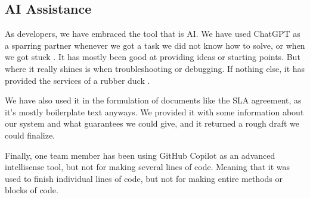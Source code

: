 \subsection{AI Assistance}

As developers, we have embraced the tool that is AI. We have used ChatGPT as a sparring partner whenever we got a task we did not know how to solve, or when we got stuck \autocite{chatgpt}. It has mostly been good at providing ideas or starting points. But where it really shines is when troubleshooting or debugging. If nothing else, it has provided the services of a rubber duck \autocite{rubber-duck-debugging}.

We have also used it in the formulation of documents like the SLA agreement, as it's mostly boilerplate text anyways. We provided it with some information about our system and what guarantees we could give, and it returned a rough draft we could finalize.

Finally, one team member has been using GitHub Copilot \autocite{github-copilot} as an advanced intellisense tool, but not for making several lines of code. Meaning that it was used to finish individual lines of code, but not for making entire methods or blocks of code.